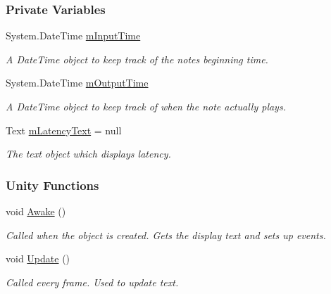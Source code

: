 \subsubsection*{Private Variables}
\begin{DoxyCompactItemize}
\item 
System.\+Date\+Time \hyperlink{group___audio_testing_a683f09700eab208b7368ebcb82bbd3be}{m\+Input\+Time}
\begin{DoxyCompactList}\small\item\em A Date\+Time object to keep track of the note\textquotesingle{}s beginning time. \end{DoxyCompactList}\item 
System.\+Date\+Time \hyperlink{group___audio_testing_a2e6f675a990948db789381f52071e1bf}{m\+Output\+Time}
\begin{DoxyCompactList}\small\item\em A Date\+Time object to keep track of when the note actually plays. \end{DoxyCompactList}\item 
Text \hyperlink{group___audio_testing_a8929a6a2ae14ec733b936a72cb0f44a6}{m\+Latency\+Text} = null
\begin{DoxyCompactList}\small\item\em The text object which displays latency. \end{DoxyCompactList}\end{DoxyCompactItemize}
\subsubsection*{Unity Functions}
\begin{DoxyCompactItemize}
\item 
void \hyperlink{group___audio_testing_a41cd250c9f5eea98dec6f32f49aa727f}{Awake} ()
\begin{DoxyCompactList}\small\item\em Called when the object is created. Gets the display text and sets up events. \end{DoxyCompactList}\item 
void \hyperlink{group___audio_testing_a4d131588b33317383ff7430b2917658e}{Update} ()
\begin{DoxyCompactList}\small\item\em Called every frame. Used to update text. \end{DoxyCompactList}\end{DoxyCompactItemize}
